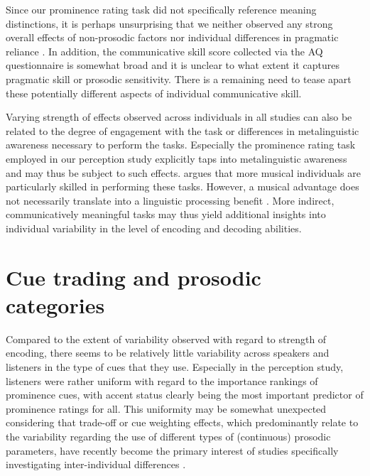 Since our prominence rating task did not specifically reference meaning distinctions, it is perhaps unsurprising that we neither observed any strong overall effects of non-prosodic factors nor individual differences in pragmatic reliance \citep[cf.][]{coleListeningSoundListening2014, coleSoundStructureMeaning2019}. In addition, the communicative skill score collected via the AQ questionnaire is somewhat broad and it is unclear to what extent it captures pragmatic skill or prosodic sensitivity. There is a remaining need to tease apart these potentially different aspects of individual communicative skill.

Varying strength of effects observed across individuals in all studies can also be related to the degree of engagement with the task or differences in metalinguistic awareness necessary to perform the tasks. Especially the prominence rating task employed in our perception study explicitly taps into metalinguistic awareness and may thus be subject to such effects. \citet{niebuhrF0basedRhythmEffects2009} argues that more musical individuals are particularly skilled in performing these tasks. However, a musical advantage does not necessarily translate into a linguistic processing benefit \citep{niebuhrF0basedRhythmEffects2009}. More indirect, communicatively meaningful tasks may thus yield additional insights into individual variability in the level of encoding and decoding abilities.

\section{Cue trading and prosodic categories}

Compared to the extent of variability observed with regard to strength of encoding, there seems to be relatively little variability across speakers and listeners in the type of cues that they use. Especially in the perception study, listeners were rather uniform with regard to the importance rankings of prominence cues, with accent status clearly being the most important predictor of prominence ratings for all. This uniformity may be somewhat unexpected considering that trade-off or cue weighting effects, which predominantly relate to the variability regarding the use of different types of (continuous) prosodic parameters, have recently become the primary interest of studies specifically investigating inter-individual differences \citep[e.g.,][]{arvanitiVariabilityOverlapCue2024, severijnenYourVOORnaamNot2024}. 

